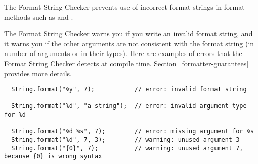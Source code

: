 \htmlhr
{}

\begin{sloppypar}
The Format String Checker
prevents use of incorrect format strings
in format methods such as
and .
\end{sloppypar}

The Format String Checker warns you if you write an invalid format string,
and it warns you if the other arguments are not consistent with the format
string (in number of arguments or in their types).
Here are examples of errors that the
Format String Checker
detects at compile time.
Section~\ref{formatter-guarantees} provides more details.



%
%

\begin{Verbatim}
  String.format("%y", 7);           // error: invalid format string

  String.format("%d", "a string");  // error: invalid argument type for %d

  String.format("%d %s", 7);        // error: missing argument for %s
  String.format("%d", 7, 3);        // warning: unused argument 3
  String.format("{0}", 7);          // warning: unused argument 7, because {0} is wrong syntax
\end{Verbatim}



